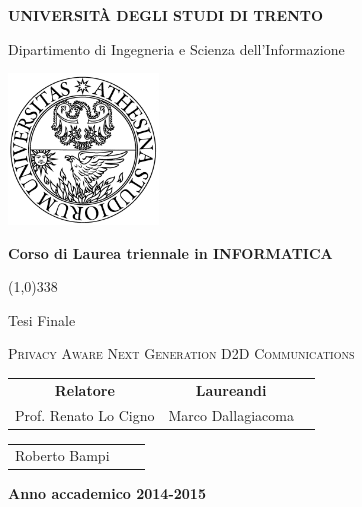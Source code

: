 \begin{titlepage}
  \pagestyle{empty}

  \begin{center}
    {\bfseries
      \Large {\huge U}NIVERSITÀ DEGLI STUDI DI {\huge T}RENTO}

    \vspace{0.2cm}

    {\Large Dipartimento di Ingegneria e Scienza dell'Informazione}

    \vspace{0.5cm}

    \begin{center}
      \includegraphics[width=0.3\textwidth]{img/logo_unitn.png}
    \end{center}

    \vspace{0.5cm}

    {\bfseries \Large Corso di Laurea triennale in INFORMATICA}

    \vspace{0.3cm}
    \line(1,0){338}
    \vspace{0.3cm}

    {\Large Tesi Finale}

    \vspace{2.5cm}

    {\huge \textsc{Privacy Aware Next Generation D2D Communications}\\}

    \vspace{3.0cm}

    \large
    \begin{center}
      \begin{tabular}{ccc}
        {\bfseries Relatore} &
        \hspace{5cm}
        {\bfseries Laureandi} \\

        Prof. Renato Lo Cigno &
        \hspace{5cm} Marco Dallagiacoma

      \end{tabular}
      
    \begin{tabular}{ccc}
        \hspace{10cm} Roberto Bampi

      \end{tabular}
    \end{center}
    \vspace{2.5cm}

    {\bfseries Anno accademico 2014-2015}
    \vfill
  \end{center}
\end{titlepage}